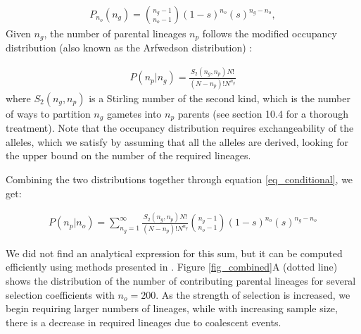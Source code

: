 \documentclass[review]{elsarticle}
\begin{document}
\begin{equation}
  \begin{aligned}
    \label{eq_neg_binomial_trials}
    P_{n_o}(n_g) = \binom{n_g-1}{n_o-1}(1-s)^{n_o}(s)^{n_g-n_o},
  \end{aligned}
\end{equation}
Given $n_g$, the number of parental lineages $n_p$ follows the modified occupancy distribution
(also known as the Arfwedson distribution) \citep{Wakeley2009,ONeill2019,JohnsonEtAl2005}: 

\begin{equation}
  \begin{aligned}
    \label{eq_occupancy}
    P(n_p|n_g) = \frac{S_2(n_g,n_p) N!}{(N-n_p)! N^{n_g}}
  \end{aligned}
\end{equation}
where $S_2(n_g,n_p)$ is a Stirling number of the second kind, which is the number of ways to
partition $n_g$ gametes into $n_p$ parents (see \cite{JohnsonEtAl2005} section 10.4 for a thorough
treatment).
Note that the occupancy distribution requires exchangeability of the alleles, which we satisfy by
assuming that all the alleles are derived, looking for the upper bound on the number of the
required lineages.

Combining the two distributions together through equation \ref{eq_conditional}, we get:

\begin{equation}
  \begin{aligned}
    \label{eq_lineages_in_past}
    P(n_p|n_o) = \sum_{n_g=1}^{\infty} \frac{S_2(n_g,n_p) N!}{(N-n_p)! N^{n_g}} \binom{n_g-1}{n_o-1}(1-s)^{n_o}(s)^{n_g-n_o}
  \end{aligned}
\end{equation}

We did not find an analytical expression for this sum, but it can be computed
efficiently using methods presented in \citep{ONeill2019}. Figure \ref{fig_combined}A (dotted line) shows
the distribution of the number of contributing parental lineages for several selection coefficients
with $n_o=200$.
As the strength of selection
is increased, we begin requiring larger numbers of lineages, while with increasing sample size,
there is a decrease in required lineages due to coalescent events.
\end{document}
